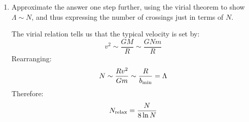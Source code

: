 \begin{enumerate}
\begin{enumerate}
\item Approximate the answer one step further, using the
virial theorem to show $\Lambda \sim N$, and thus expressing the
number of crossings just in terms of $N$.

\begin{answer}
The virial relation tells us that the typical velocity is set by:
\begin{equation}
v^2 \sim \frac{GM}{R} \sim \frac{GN m}{R}
\end{equation}
Rearranging:
\begin{equation}
N \sim \frac{R v^2}{Gm} \sim \frac{R}{b_{\rm min}} = \Lambda
\end{equation}
Therefore:
\begin{equation}
N_{\rm relax} = \frac{N}{8 \ln N}
\end{equation}
\end{answer}
\end{enumerate}


\end{enumerate}

